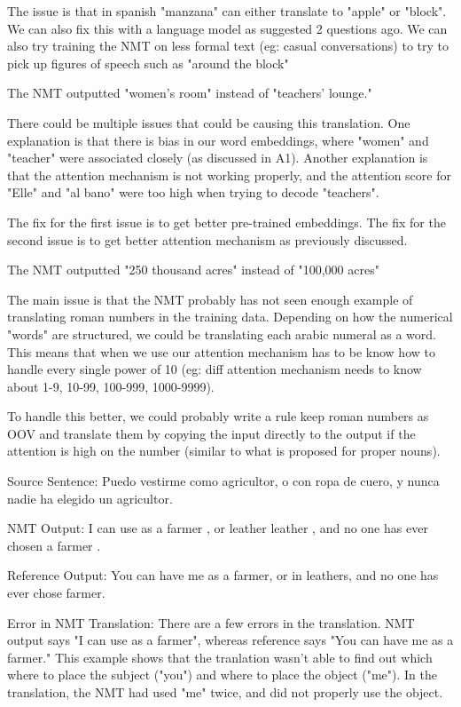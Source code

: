 \documentclass[11pt,largemargins]{homework}
\begin{document}
The issue is that in spanish "manzana" can either translate to "apple" or "block". We can also fix this with a language model as suggested 2 questions ago. We can also try training the NMT on less formal text (eg: casual conversations) to try to pick up figures of speech such as "around the block"

\question

The NMT outputted "women’s room" instead of "teachers’ lounge."

There could be multiple issues that could be causing this translation. One explanation is that there is bias in our word embeddings, where "women" and "teacher" were associated closely (as discussed in A1). Another explanation is that the attention mechanism is not working properly, and the attention score for "Elle" and "al  bano" were too high when trying to decode "teachers". 

The fix for the first issue is to get better pre-trained embeddings. The fix for the second issue is to get better attention mechanism as previously discussed. 


\question
The NMT outputted "250 thousand acres" instead of "100,000 acres"

The main issue is that the NMT probably has not seen enough example of translating roman numbers in the training data. Depending on how the numerical "words" are structured, we could be translating each arabic numeral as a word. This means that when we use our attention mechanism has to be know how to handle every single power of 10 (eg: diff attention mechanism needs to know about 1-9, 10-99, 100-999, 1000-9999). 

To handle this better, we could probably write a rule keep roman numbers as OOV and translate them by copying the input directly to the output if the attention is high on the number (similar to what is proposed for proper nouns). 


\question
Source Sentence: Puedo vestirme como agricultor, o con ropa de cuero, y nunca nadie ha elegido un agricultor.

NMT Output: I can use as a farmer , or leather leather , and no one has ever chosen a farmer .

Reference Output: You can have me as a farmer, or in leathers,  and no one has ever chose farmer.

Error in NMT Translation: There are a few errors in the translation. NMT output says "I can use as a farmer", whereas reference says "You can have me as a farmer." This example shows that the tranlation wasn't able to find out which where to place the subject ("you") and where to place the object ("me"). In the translation, the NMT had used "me" twice, and did not properly use the object. 
\end{document}
